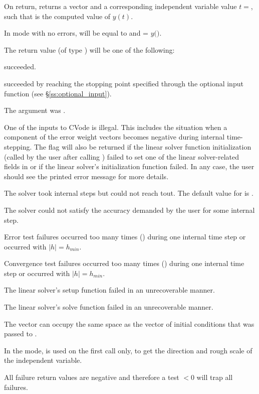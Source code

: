 {
  On return,  returns a vector  and a corresponding 
  independent variable value $t=$, such that  is the computed 
  value of $y(t)$.

  In  mode with no errors,  will be equal to  
  and  = $y($$)$.

  The return value  (of type ) will be one of the following:
  \begin{args}
  \item[\Id{SUCCESS}]
     succeeded.
  \item[\ID{TSTOP\_RETURN}]
     succeeded by reaching the stopping point specified through
    the optional input function  (see \S\ref{ss:optional_input}).
  \item[\ID{CVODE\_NO\_MEM}]
    The  argument was .
  \item[\ID{ILL\_INPUT}]
    One of the inputs to CVode is illegal. This includes the situation when a 
    component of the error weight vectors becomes negative during internal 
    time-stepping. The  flag will also be returned if the linear 
    solver function initialization (called by the user after calling 
    ) failed to set one of the linear solver-related fields 
    in  or if the linear solver's initialization function failed. 
    In any case, the user should see the printed error message for more details.
  \item[\ID{TOO\_MUCH\_WORK}] 
    The solver took  internal steps but could not reach tout. 
    The default value for  is .
  \item[\ID{TOO\_MUCH\_ACC}] 
    The solver could not satisfy the accuracy demanded by the user for some 
    internal step.
  \item[\ID{ERR\_FAILURE}]
    Error test failures occurred too many times () during one 
    internal time step or occurred with $|h| = h_{min}$.
  \item[\ID{CONV\_FAILURE}] 
    Convergence test failures occurred too many times () during 
    one internal time step or occurred with $|h| = h_{min}$.             
  \item[\ID{SETUP\_FAILURE}] 
    The linear solver's setup function failed in an unrecoverable manner.
  \item[\ID{SOLVE\_FAILURE}] 
    The linear solver's solve function failed in an unrecoverable manner.
  \end{args} 
}
{
  The vector  can occupy the same space as the  vector of 
  initial conditions that was passed to . 

  In the  mode,  is used on the first call only, 
  to get the direction and rough scale of the independent variable.

  All failure return values are negative and therefore a test $< 0$
  will trap all  failures.
}

